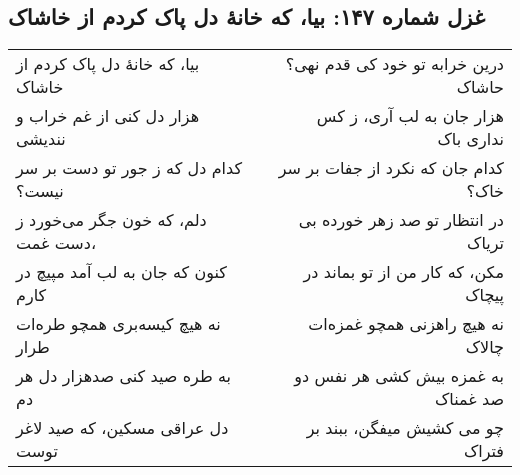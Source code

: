 \begin{center}
\section*{غزل شماره ۱۴۷: بیا، که خانهٔ دل پاک کردم از خاشاک}
\label{sec:147}
\begin{longtable}{l p{0.5cm} r}
بیا، که خانهٔ دل پاک کردم از خاشاک
&&
درین خرابه تو خود کی قدم نهی؟ حاشاک
\\
هزار دل کنی از غم خراب و نندیشی
&&
هزار جان به لب آری، ز کس نداری باک
\\
کدام دل که ز جور تو دست بر سر نیست؟
&&
کدام جان که نکرد از جفات بر سر خاک؟
\\
دلم، که خون جگر می‌خورد ز دست غمت،
&&
در انتظار تو صد زهر خورده بی تریاک
\\
کنون که جان به لب آمد مپیچ در کارم
&&
مکن، که کار من از تو بماند در پیچاک
\\
نه هیچ کیسه‌بری همچو طره‌ات طرار
&&
نه هیچ راهزنی همچو غمزه‌ات چالاک
\\
به طره صید کنی صدهزار دل هر دم
&&
به غمزه بیش کشی هر نفس دو صد غمناک
\\
دل عراقی مسکین، که صید لاغر توست
&&
چو می کشیش میفگن، ببند بر فتراک
\\
\end{longtable}
\end{center}
